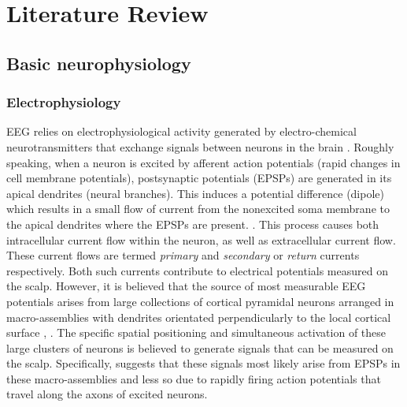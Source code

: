 \chapter{Literature Review}
\label{chapter:lit-review}

\graphicspath{ {report/C2 Literature Review/assets/} } 

\section{Basic neurophysiology}

\subsection{Electrophysiology}
EEG relies on electrophysiological activity generated by electro-chemical neurotransmitters that exchange signals between neurons in the brain \cite{bci-survey-nicolas-alonso}. Roughly speaking, when a neuron is excited by afferent action potentials (rapid changes in cell membrane potentials), postsynaptic potentials (EPSPs) are generated in its apical dendrites \cite{baillet-em-brain-mapping} (neural branches). This induces a potential difference (dipole) which results in a small flow of current from the nonexcited soma membrane to the apical dendrites where the EPSPs are present. \cite{baillet-em-brain-mapping}. This process causes both intracellular current flow within the neuron, as well as extracellular current flow. These current flows are termed \textit{primary} and \textit{secondary} or \textit{return} currents respectively. Both such currents contribute to electrical potentials measured on the scalp. However, it is believed that the source of most measurable EEG potentials arises from large collections of cortical pyramidal neurons arranged in macro-assemblies with dendrites orientated perpendicularly to the local cortical surface \cite{baillet-em-brain-mapping}, \cite{teplan-eeg-measurement}. The specific spatial positioning and simultaneous activation of these large clusters of neurons is believed to generate signals that can be measured on the scalp. Specifically, \cite{baillet-em-brain-mapping} suggests that these signals most likely arise from EPSPs in these macro-assemblies and less so due to rapidly firing action potentials that travel along the axons of excited neurons.

